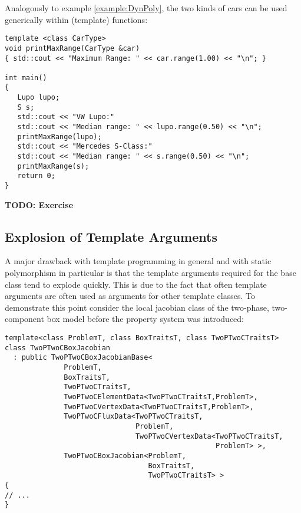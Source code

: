 Analogously to example \ref{example:DynPoly}, the two kinds of cars
can be used generically within (template) functions:
\begin{verbatim}
template <class CarType>
void printMaxRange(CarType &car)
{ std::cout << "Maximum Range: " << car.range(1.00) << "\n"; }

int main()
{
   Lupo lupo;
   S s;
   std::cout << "VW Lupo:"
   std::cout << "Median range: " << lupo.range(0.50) << "\n";
   printMaxRange(lupo);
   std::cout << "Mercedes S-Class:"
   std::cout << "Median range: " << s.range(0.50) << "\n";
   printMaxRange(s);
   return 0;
}
\end{verbatim}

\textbf{TODO: Exercise}

\subsection*{Explosion of Template Arguments}

A major drawback with template programming in general and with static
polymorphism in particular is that the template arguments required for
the base class tend to explode quickly. This is due to the fact that
often template arguments are often used as arguments for other
template classes. To demonstrate this point consider the local
jacobian class of the two-phase, two-component box model before the
\Dumux property system was introduced:
\begin{verbatim}
template<class ProblemT, class BoxTraitsT, class TwoPTwoCTraitsT>
class TwoPTwoCBoxJacobian
  : public TwoPTwoCBoxJacobianBase<
              ProblemT, 
              BoxTraitsT,
              TwoPTwoCTraitsT,
              TwoPTwoCElementData<TwoPTwoCTraitsT,ProblemT>,
              TwoPTwoCVertexData<TwoPTwoCTraitsT,ProblemT>,
              TwoPTwoCFluxData<TwoPTwoCTraitsT,
                               ProblemT,
                               TwoPTwoCVertexData<TwoPTwoCTraitsT,
                                                  ProblemT> >,
              TwoPTwoCBoxJacobian<ProblemT,
                                  BoxTraitsT,
                                  TwoPTwoCTraitsT> >
{
// ...
}
\end{verbatim}



